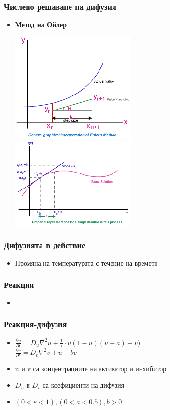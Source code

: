 \documentclass[14pt]{beamer}
\begin{document}
\begin{frame}
\frametitle{Числено решаване на дифузия}
\begin{itemize}
  \item \textbf{Метод на Ойлер}
\begin{center}
\includegraphics[width=0.5\textwidth]{euler1.png}
\includegraphics[width=0.5\textwidth]{euler2.png}
\end{center}
\end{itemize}
\end{frame}

\begin{frame}
\frametitle{Дифузията в действие}
\begin{itemize}
  \item Промяна на температурата с течение на времето
\end{itemize}
\begin{center}
\end{center}
\end{frame}

\begin{frame}
\frametitle{Реакция}
\begin{itemize}
  \item \textbf{}
\end{itemize}
\end{frame}

\begin{frame}
\frametitle{Реакция-дифузия}
\begin{itemize}
  \item $\frac{\partial u}{\partial t} = D_{u} \nabla^2 u + \frac{1}{\varepsilon}\cdot u(1-u)(u-a)-v)$\\
  $\frac{\partial v}{\partial t} = D_{v} \nabla^2 v + u -bv$
  \item u и v са концентрациите на активатор и инхибитор
  \item $D_u$ и $D_v$ са коефициенти на дифузия
  \item $(0 < \varepsilon < 1), (0 < a < 0.5), b>0$
\end{itemize}
\end{frame}
\end{document}
